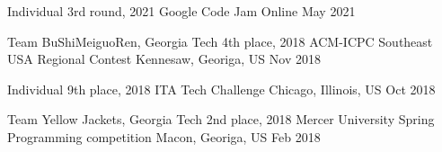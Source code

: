 


%
%
%
%
%
%

\begin{cventries}
	
	
\cventry
{Individual} %
{3rd round, 2021 Google Code Jam} %
{Online} %
{May 2021} %
{} %
	
	
\cventry
{Team BuShiMeiguoRen, Georgia Tech} %
{4th place, 2018 ACM-ICPC Southeast USA Regional Contest} %
{Kennesaw, Georiga, US} %
{Nov 2018} %
{
} %
	

\cventry
{Individual} %
{9th place, 2018 ITA Tech Challenge} %
{Chicago, Illinois, US} %
{Oct 2018} %
{} %


\cventry
{Team Yellow Jackets, Georgia Tech} %
{2nd place, 2018 Mercer University Spring Programming competition} %
{Macon, Georiga, US} %
{Feb 2018} %
{
} %



\end{cventries}
